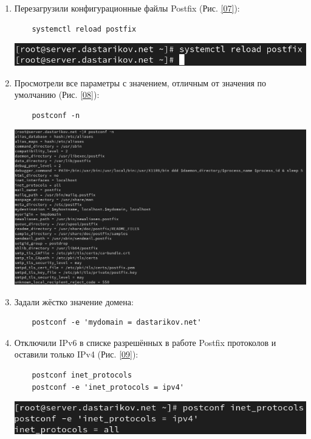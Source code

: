 \begin{enumerate}
\item Перезагрузили конфигурационные файлы Postfix (Рис. \ref{07}):
  \begin{verbatim}
    systemctl reload postfix
  \end{verbatim}
\begin{center}
    \centering
    \includegraphics[width=\textwidth]{../images/image07.png}
    \label{07}
\end{center}

\item Просмотрели все параметры с значением, отличным от значения по умолчанию (Рис. \ref{08}):
  \begin{verbatim}
    postconf -n
  \end{verbatim}
\begin{center}
    \centering
    \includegraphics[width=\textwidth]{../images/image08.png}
    \label{08}
\end{center}

\item Задали жёстко значение домена:
  \begin{verbatim}
    postconf -e 'mydomain = dastarikov.net'
  \end{verbatim}
\item Отключили IPv6 в списке разрешённых в работе Postfix протоколов и оставили только IPv4 (Рис. \ref{09}):
  \begin{verbatim}
    postconf inet_protocols
    postconf -e 'inet_protocols = ipv4'
  \end{verbatim}
\begin{center}
    \centering
    \includegraphics[width=\textwidth]{../images/image09.png}
    \label{09}
\end{center}


\end{enumerate}
